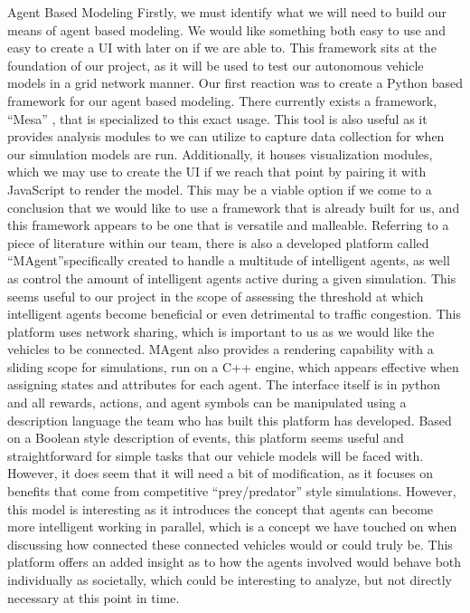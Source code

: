\documentclass[letterpaper,10pt,draftclsnofoot,onecolumn]{IEEEtran} %
\begin{document}
\begin{section}{Agent Based Modeling}
Firstly, we must identify what we will need to build our means of agent based modeling. We would like something
both easy to use and easy to create a UI with later on if we are able to. This framework sits at the foundation of our
project, as it will be used to test our autonomous vehicle models in a grid network manner.
Our first reaction was to create a Python based framework for our agent based modeling. There currently exists a
framework, “Mesa”\cite{Mesa}
, that is specialized to this exact usage. This tool is also useful as it provides analysis modules to
we can utilize to capture data collection for when our simulation models are run. Additionally, it houses visualization
modules, which we may use to create the UI if we reach that point by pairing it with JavaScript to render the model.
This may be a viable option if we come to a conclusion that we would like to use a framework that is already built for
us, and this framework appears to be one that is versatile and malleable.
Referring to a piece of literature within our team, there is also a developed platform called “MAgent”\cite{MAgent}specifically
created to handle a multitude of intelligent agents, as well as control the amount of intelligent agents active during a
given simulation. This seems useful to our project in the scope of assessing the threshold at which intelligent agents
become beneficial or even detrimental to traffic congestion. This platform uses network sharing, which is important
to us as we would like the vehicles to be connected. MAgent also provides a rendering capability with a sliding scope
for simulations, run on a C++ engine, which appears effective when assigning states and attributes for each agent. The
interface itself is in python and all rewards, actions, and agent symbols can be manipulated using a description
language the team who has built this platform has developed. Based on a Boolean style description of events, this
platform seems useful and straightforward for simple tasks that our vehicle models will be faced with. However, it
does seem that it will need a bit of modification, as it focuses on benefits that come from competitive “prey/predator”
style simulations. However, this model is interesting as it introduces the concept that agents can become more
intelligent working in parallel, which is a concept we have touched on when discussing how connected these connected
vehicles would or could truly be. This platform offers an added insight as to how the agents involved would behave
both individually as societally, which could be interesting to analyze, but not directly necessary at this point in time.
\end{section}
\end{document}

